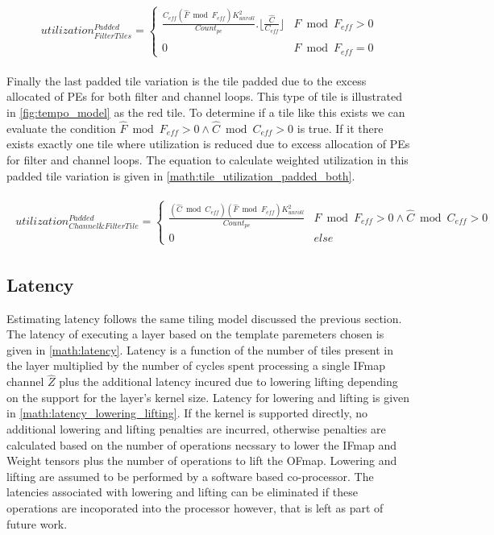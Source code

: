 \begin{align}
    \begin{gathered}
        utilization^{Padded}_{FilterTiles} = \begin{cases} \frac{ C_{eff} (\hat{F} \bmod F_{eff}) K_{unroll}^2}{Count_{pe}}.\lfloor \frac{\hat{C}}{C_{eff}} \rfloor
            & \hat{F} \bmod F_{eff} > 0 \\ 0
            & \hat{F} \bmod F_{eff} = 0 \end{cases}
            \end{gathered}
    \label{math:tile_utilization_padded_filter}
\end{align}

Finally the last padded tile variation is the tile padded due to the excess
allocated of PEs for both filter and channel loops. This type of tile is
illustrated in \autoref{fig:tempo_model} as the red tile.  To determine if a tile like this
exists we can evaluate the condition $\hat{F} \bmod F_{eff} > 0 \land \hat{C}
\bmod C_{eff} > 0$ is true. If it there exists exactly one tile where
utilization is reduced due to excess allocation of PEs for filter and channel
loops. The equation to calculate weighted utilization in this padded tile
variation is given in \autoref{math:tile_utilization_padded_both}.

\begin{align}
    \begin{gathered}
         utilization^{Padded}_{Channel\&FilterTile} = \begin{cases} \frac{(\hat{C} \bmod C_{eff}) (\hat{F} \bmod F_{eff}) K_{unroll}^2}{Count_{pe}} & \hat{F} \bmod F_{eff} > 0 \land \hat{C} \bmod C_{eff} > 0 \\0  & else\end{cases}
            \end{gathered}
    \label{math:tile_utilization_padded_both}
\end{align}

\subsection{Latency}
\label{chap:dataflow_dse:exploring:tempo_model:latency}

Estimating latency follows the same tiling model discussed the previous
section. The latency of executing a layer based on the template paremeters
chosen is given in \autoref{math:latency}. Latency is a function of the number of
tiles present in the layer multiplied by the number of cycles spent processing a
single IFmap channel $\hat{Z}$ plus the additional latency incured due to
lowering lifting depending on the support for the layer's kernel size. Latency
for lowering and lifting is given in \autoref{math:latency_lowering_lifting}. If
the kernel is supported directly, no additional lowering and lifting penalties
are incurred, otherwise penalties are calculated based on the number of
operations necssary to lower the IFmap and Weight tensors plus the number of
operations to lift the OFmap. Lowering and lifting are assumed to be performed
by a software based co-processor. The latencies associated with lowering and
lifting can be eliminated if these operations are incoporated into the processor
however, that is left as part of future work. 

